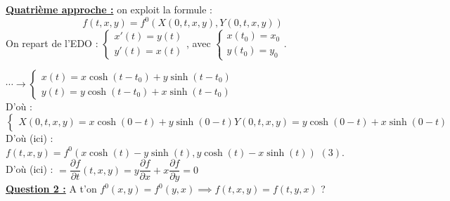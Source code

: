 \documentclass[12pt,a4paper]{article}
\begin{document}
\begin{sol}
\begin{minipage}{18.5cm}
				\textbf{\underline{Quatrième approche :}} on exploit la formule :
				\[f(t,x,y) = f^0(X(0,t,x,y),Y(0,t,x,y))\]
				On repart de l'EDO : $\begin{cases}
					x'(t) = y(t)\\
					y'(t) = x(t)
				\end{cases}$, avec $\begin{cases}
				x(t_0) = x_0\\
				y(t_0) = y_0
				\end{cases}$.				
			\end{minipage}
			\begin{minipage}[t]{18.5cm}
				$\cdots\to\begin{cases}
					x(t) = x\cosh(t-t_0)+y\sinh(t-t_0)\\
					y(t) = y\cosh(t-t_0) + x\sinh(t-t_0)
				\end{cases}$\\
				D'où : $\begin{cases}
					X(0,t,x,y) = x\cosh(0-t) + y\sinh(0-t)
					Y(0,t,x,y) = y\cosh(0-t) + x\sinh(0-t)
				\end{cases}$\\
				D'où (ici) : $f(t,x,y) = f^0(x\cosh(t)-y\sinh(t),y\cosh(t)-x\sinh(t))$ $(3)$.\\
				D'où (ici) : $= \dfrac{\partial f}{\partial t}(t,x,y) = y\dfrac{\partial f}{\partial x} + x\dfrac{\partial f}{\partial y} = 0$\\
				
				\textbf{\underline{Question 2 :}} A t'on $f^0(x,y) = f^0(y,x) \implies f(t,x,y) = f(t,y,x)$ ?
				

\end{minipage}
\end{sol}
\end{document}
